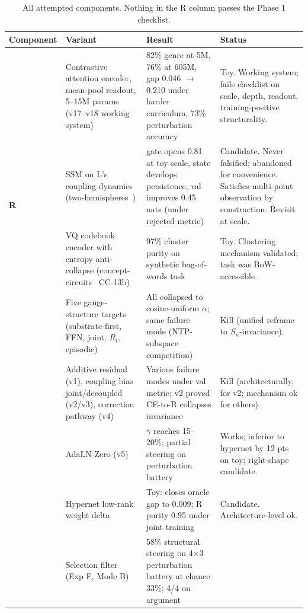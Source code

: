 \documentclass[10pt, twocolumn, a4paper]{article}
\begin{document}
\begin{table}[t]
\centering\small
\caption{All attempted components. Nothing in the R column passes the Phase 1 checklist.}
\label{tab:genealogy}
\begin{tabular}{@{}p{1.6cm} p{5.0cm} p{6.3cm} p{3.4cm}@{}}
\toprule
Component & Variant & Result & Status \\
\midrule
{}
& Contrastive attention encoder, mean-pool readout, 5--15M params (v17--v18 working system)
& 82\% genre at 5M, 76\% at 605M, gap 0.046 $\to$ 0.210 under harder curriculum, 73\% perturbation accuracy
& Toy. Working system; fails checklist on scale, depth, readout, training-positive structurality. \\
\addlinespace[2pt]
& SSM on L's coupling dynamics (two-hemispheres~\cite{two-hemispheres})
& gate opens 0.81 at toy scale, state develops persistence, val improves 0.45 nats (under rejected metric)
& Candidate. Never falsified; abandoned for convenience. Satisfies multi-point observation by construction. Revisit at scale. \\
\addlinespace[2pt]
& VQ codebook encoder with entropy anti-collapse (concept-circuits~\cite{concept-circuits} CC-13b)
& 97\% cluster purity on synthetic bag-of-words task
& Toy. Clustering mechanism validated; task was BoW-accessible. \\
\addlinespace[2pt]
& Five gauge-structure targets (substrate-first, FFN, joint, $R_l$, episodic)
& All collapsed to cosine-uniform $\alpha$; same failure mode (NTP-subspace competition)
& Kill (unified reframe to $S_n$-invariance). \\
\midrule
{}
& Additive residual (v1), coupling bias joint/decoupled (v2/v3), correction pathway (v4)
& Various failure modes under val metric; v2 proved CE-to-R collapses invariance
& Kill (architecturally, for v2; mechanism ok for others). \\
\addlinespace[2pt]
& AdaLN-Zero (v5)
& $\gamma$ reaches 15--20\%; partial steering on perturbation battery
& Works; inferior to hypernet by 12 pts on toy; right-shape candidate. \\
\addlinespace[2pt]
& Hypernet low-rank weight delta
& Toy: closes oracle gap to 0.009; R purity 0.95 under joint training
& Candidate. Architecture-level ok. \\
\addlinespace[2pt]
& Selection filter (Exp F, Mode B)
& 58\% structural steering on 4$\times$3 perturbation battery at chance 33\%; 4/4 on argument

\end{tabular}
\end{table}
\end{document}
